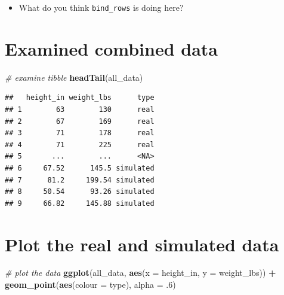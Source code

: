 \documentclass[
]{article}
\newenvironment{Shaded}{\begin{snugshade}}{\end{snugshade}}
\newcommand{\AttributeTok}[1]{\textcolor[rgb]{0.13,0.29,0.53}{#1}}
\newcommand{\CommentTok}[1]{\textcolor[rgb]{0.56,0.35,0.01}{\textit{#1}}}
\newcommand{\DecValTok}[1]{\textcolor[rgb]{0.00,0.00,0.81}{#1}}
\newcommand{\FunctionTok}[1]{\textcolor[rgb]{0.13,0.29,0.53}{\textbf{#1}}}
\newcommand{\NormalTok}[1]{#1}
\newcommand{\SpecialCharTok}[1]{\textcolor[rgb]{0.81,0.36,0.00}{\textbf{#1}}}
\providecommand{\tightlist}{%
  \setlength{\itemsep}{0pt}\setlength{\parskip}{0pt}}
\begin{document}
\begin{itemize}
\tightlist
\item
  What do you think \texttt{bind\_rows} is doing here?
\end{itemize}

\hypertarget{examined-combined-data}{%
\section{Examined combined data}\label{examined-combined-data}}

\begin{Shaded}
\begin{Highlighting}[]
\CommentTok{\# examine tibble}
\FunctionTok{headTail}\NormalTok{(all\_data)}
\end{Highlighting}
\end{Shaded}

\begin{verbatim}
##   height_in weight_lbs      type
## 1        63        130      real
## 2        67        169      real
## 3        71        178      real
## 4        71        225      real
## 5       ...        ...      <NA>
## 6     67.52      145.5 simulated
## 7      81.2     199.54 simulated
## 8     50.54      93.26 simulated
## 9     66.82     145.88 simulated
\end{verbatim}

\hypertarget{plot-the-real-and-simulated-data}{%
\section{Plot the real and simulated
data}\label{plot-the-real-and-simulated-data}}

\begin{Shaded}
\begin{Highlighting}[]
\CommentTok{\# plot the data}
\FunctionTok{ggplot}\NormalTok{(all\_data,}
       \FunctionTok{aes}\NormalTok{(}\AttributeTok{x =}\NormalTok{ height\_in, }
           \AttributeTok{y =}\NormalTok{ weight\_lbs)) }\SpecialCharTok{+}
  \FunctionTok{geom\_point}\NormalTok{(}\FunctionTok{aes}\NormalTok{(}\AttributeTok{colour =}\NormalTok{ type), }
             \AttributeTok{alpha =}\NormalTok{ .}\DecValTok{6}\NormalTok{)}
\end{Highlighting}
\end{Shaded}
\end{document}
